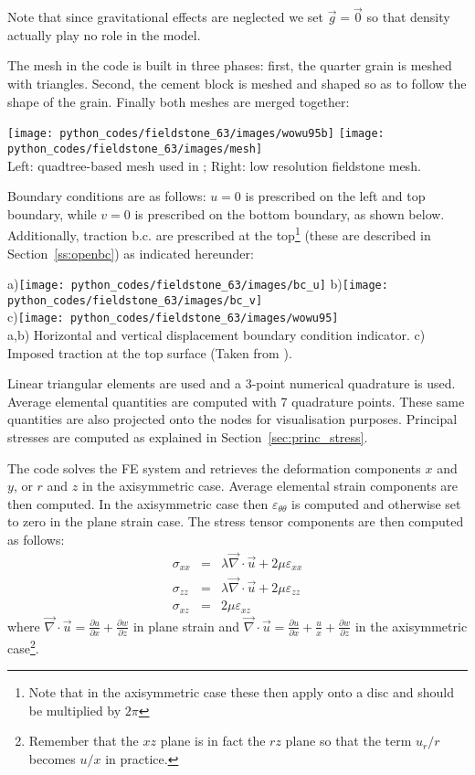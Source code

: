 Note that since gravitational effects are neglected we set $\vec{g}=\vec{0}$
so that density actually play no role in the model.

The mesh in the code is built in three phases: first, the quarter grain is meshed 
with triangles. Second, the cement block is meshed and shaped so as to follow the 
shape of the grain. Finally both meshes are merged together:

\begin{center}
\texttt{[image: python\_codes/fieldstone\_63/images/wowu95b]}
\texttt{[image: python\_codes/fieldstone\_63/images/mesh]}\\
{\captionfont Left: quadtree-based mesh used in \cite{wowu95}; 
Right: low resolution fieldstone mesh.}
\end{center}

Boundary conditions are as follows: $u=0$ is prescribed on the left and top boundary, 
while $v=0$ is prescribed on the bottom boundary, as shown below.
Additionally, traction b.c. are prescribed at the top\footnote{Note that 
in the axisymmetric case these then apply onto a disc and should be multiplied by $2\pi$} (these
are described in Section~\ref{ss:openbc}) as indicated hereunder:
\begin{center}
a)\texttt{[image: python\_codes/fieldstone\_63/images/bc\_u]}
b)\texttt{[image: python\_codes/fieldstone\_63/images/bc\_v]}\\
c)\texttt{[image: python\_codes/fieldstone\_63/images/wowu95]}\\
{\captionfont a,b) Horizontal and vertical displacement boundary condition indicator.
c) Imposed traction at the top surface (Taken from \cite{wowu95}).}
\end{center}

Linear triangular elements are used and a 3-point numerical quadrature is used.
Average elemental quantities are computed with 7 quadrature points.
These same quantities are also projected onto the nodes for visualisation purposes.
Principal stresses are computed as explained in Section~\ref{sec:princ_stress}.

The code solves the FE system and retrieves the deformation components $x$ and $y$,
or $r$ and $z$ in the axisymmetric case.
Average elemental strain components are then computed. In the axisymmetric case
then  $\varepsilon_{\theta\theta}$ is computed and otherwise set to zero in the plane strain case.
The stress tensor components are then computed as follows:
\begin{eqnarray}
\sigma_{xx} &=& \lambda \vec\nabla\cdot\vec{u} + 2\mu \varepsilon_{xx} \\
\sigma_{zz} &=& \lambda \vec\nabla\cdot\vec{u} + 2\mu \varepsilon_{zz} \\
\sigma_{xz} &=&  2\mu \varepsilon_{xz} 
\end{eqnarray}
where $\vec\nabla\cdot\vec{u}=\frac{\partial u}{\partial x} + \frac{\partial w}{\partial z}$
in plane strain and 
$\vec\nabla\cdot\vec{u}=\frac{\partial u}{\partial x} + \frac{u}{x} + \frac{\partial w}{\partial z}$
in the axisymmetric case\footnote{Remember that the $xz$ plane is in fact the $rz$ plane so that 
the term $u_r/r$ becomes $u/x$ in practice.}.

